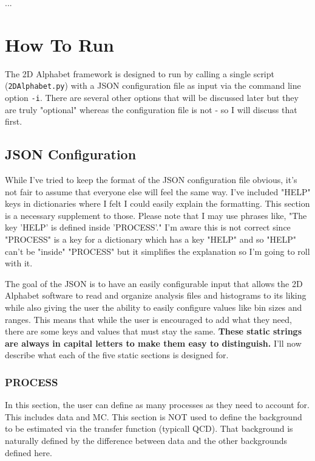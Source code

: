 \documentclass[letter]{article}
\begin{document}
    ...

\section{How To Run}
    The 2D Alphabet framework is designed to run by calling a single script (\verb"2DAlphabet.py") with a JSON configuration file as input via the command line option \verb"-i". There are several other options that will be discussed later but they are truly "optional" whereas the configuration file is not - so I will discuss that first.

    \subsection{JSON Configuration}
        While I've tried to keep the format of the JSON configuration file obvious, it's not fair to assume that everyone else will feel the same way. I've included "HELP" keys in dictionaries where I felt I could easily explain the formatting. This section is a necessary supplement to those. Please note that I may use phrases like, "The key 'HELP' is defined inside 'PROCESS'." I'm aware this is not correct since "PROCESS" is a key for a dictionary which has a key "HELP" and so "HELP" can't be "inside" "PROCESS" but it simplifies the explanation so I'm going to roll with it.  

        The goal of the JSON is to have an easily configurable input that allows the 2D Alphabet software to read and organize analysis files and histograms to its liking while also giving the user the ability to easily configure values like bin sizes and ranges. This means that while the user is encouraged to add what they need, there are some keys and values that must stay the same. \textbf{These static strings are always in capital letters to make them easy to distinguish.} I'll now describe what each of the five static sections is designed for.

        \subsubsection{PROCESS}
            In this section, the user can define as many processes as they need to account for. This includes data and MC. This section is NOT used to define the background to be estimated via the transfer function (typicall QCD). That background is naturally defined by the difference between data and the other backgrounds defined here.
\end{document}

